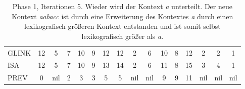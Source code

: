 \begin{table}[H]
\begin{adjustbox}{max width=\textwidth}
\begin{tabular}{lccccccccccccccc}
\multicolumn{1}{l|}{GLINK}   & 12                      & \cellcolor[HTML]{\red}5 & 7                         & 10                      & 9                                                   & 12                        & 12                         & 2                         & 6                        & 10 & 8                       & 12 & 2                         & 2                         & 1   \\
\multicolumn{1}{l|}{ISA}     & 12                      & \cellcolor[HTML]{\red}5 & 7                         & 10                      & 9                                                   & 13                        & 14                         & \cellcolor[HTML]{\red}2 & 6                        & 11 & 8                       & 15 & \cellcolor[HTML]{\red}3 & \cellcolor[HTML]{\red}4 & 1   \\
\multicolumn{1}{l|}{PREV}    & 0                       & nil                       & \cellcolor[HTML]{\red}2 & 3                       & 3                                                   & 5                         & 5                          & nil                       & nil                      & 9  & 9                       & 11 & nil                       & nil                       & nil
\end{tabular}
\end{adjustbox}

\caption[Phase 1, Iterationen 5]{Phase 1, Iterationen 5. Wieder wird der Kontext \textit{a} unterteilt. Der neue Kontext \textit{aabacc} ist durch eine Erweiterung des Kontextes \textit{a} durch einen lexikografisch größeren Kontext entstanden und ist somit selbst lexikografisch größer als \textit{a}.}
\label{table_complex_example_1_5} 
\end{table}

